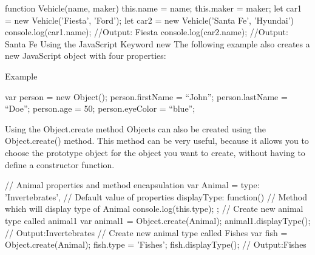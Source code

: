 function Vehicle(name, maker) {
   this.name = name;
   this.maker = maker;
}
let car1 = new Vehicle(’Fiesta’, 'Ford’);
let car2 = new Vehicle(’Santa Fe’, 'Hyundai’)
console.log(car1.name);    //Output: Fiesta
console.log(car2.name);    //Output: Santa Fe
Using the JavaScript Keyword new
The following example also creates a new JavaScript object with four properties:

Example

var person = new Object();
person.firstName = “John”;
person.lastName = “Doe”;
person.age = 50;
person.eyeColor = “blue”;

Using the Object.create method
Objects can also be created using the Object.create() method. This method can be very useful, because it allows you to choose the prototype object for the object you want to create, without having to define a constructor function.

// Animal properties and method encapsulation
var Animal = {
  type: 'Invertebrates', // Default value of properties
  displayType: function() {  // Method which will display type of Animal
    console.log(this.type);
  }
};
// Create new animal type called animal1 
var animal1 = Object.create(Animal);
animal1.displayType(); // Output:Invertebrates
// Create new animal type called Fishes
var fish = Object.create(Animal);
fish.type = 'Fishes';
fish.displayType(); 
// Output:Fishes